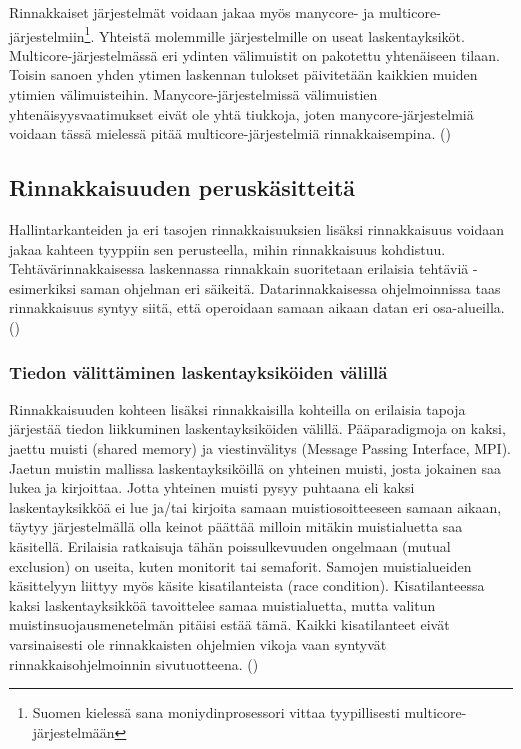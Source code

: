 Rinnakkaiset järjestelmät voidaan jakaa myös manycore- ja
multicore-järjestelmiin\footnote{Suomen kielessä sana moniydinprosessori
vittaa tyypillisesti multicore-järjestelmään}. Yhteistä molemmille
järjestelmille on useat laskentayksiköt. Multicore-järjestelmässä eri
ydinten välimuistit on pakotettu yhtenäiseen tilaan. Toisin sanoen yhden
ytimen laskennan tulokset päivitetään kaikkien muiden ytimien välimuisteihin.
Manycore-järjestelmissä välimuistien yhtenäisyysvaatimukset eivät ole yhtä
tiukkoja, joten manycore-järjestelmiä voidaan tässä mielessä pitää
multicore-järjestelmiä rinnakkaisempina. (\citealt{vajda})

\subsection{Rinnakkaisuuden peruskäsitteitä}

Hallintarkanteiden ja eri tasojen rinnakkaisuuksien lisäksi rinnakkaisuus voidaan jakaa
kahteen tyyppiin sen perusteella, mihin rinnakkaisuus kohdistuu.
Tehtävärinnakkaisessa laskennassa rinnakkain suoritetaan erilaisia
tehtäviä - esimerkiksi saman ohjelman eri säikeitä. Datarinnakkaisessa
ohjelmoinnissa taas rinnakkaisuus syntyy siitä, että operoidaan samaan aikaan
datan eri osa-alueilla. (\citealt{intro})

\subsubsection{Tiedon välittäminen laskentayksiköiden välillä}

Rinnakkaisuuden kohteen lisäksi rinnakkaisilla kohteilla on erilaisia tapoja
järjestää tiedon liikkuminen laskentayksiköiden välillä. Pääparadigmoja on
kaksi, jaettu muisti (shared memory) ja viestinvälitys (Message Passing Interface, MPI). Jaetun muistin mallissa
laskentayksiköillä on yhteinen muisti, josta jokainen saa lukea ja kirjoittaa.
Jotta yhteinen muisti pysyy puhtaana eli kaksi laskentayksikköä ei lue ja/tai
kirjoita samaan muistiosoitteeseen samaan aikaan, täytyy järjestelmällä
olla keinot päättää milloin mitäkin muistialuetta saa käsitellä.
Erilaisia ratkaisuja tähän poissulkevuuden ongelmaan (mutual exclusion) on useita, kuten
monitorit tai semaforit. Samojen muistialueiden käsittelyyn
liittyy myös käsite kisatilanteista (race condition). Kisatilanteessa kaksi
laskentayksikköä tavoittelee samaa muistialuetta, mutta valitun
muistinsuojausmenetelmän pitäisi estää tämä. Kaikki kisatilanteet eivät varsinaisesti
ole rinnakkaisten ohjelmien vikoja vaan syntyvät rinnakkaisohjelmoinnin
sivutuotteena. (\citealt{ari})

